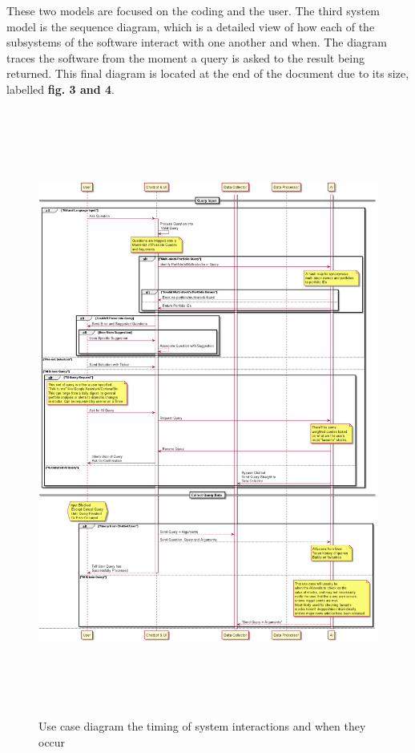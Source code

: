 \documentclass[]{IEEEtran}
\begin{document}
	These two models are focused on the coding and the user. The third system model is the sequence diagram, which is a detailed view of how each of the subsystems of the software interact with one another and when. The diagram traces the software from the moment a query is asked to the result being returned. This final diagram is located at the end of the document due to its size, labelled \textbf{fig. 3 and 4}.
	
	\begin{figure}[h]
		\includegraphics[width=\textwidth, height = 20cm]{sequence}
		\caption{Use case diagram the timing of system interactions and when they occur}
	\end{figure}
	
\end{document}
